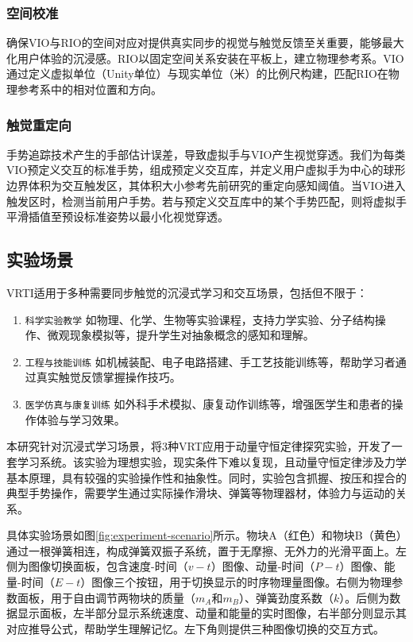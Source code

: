\documentclass[runningheads]{llncs}
\begin{document}
\subsubsection{空间校准}
确保VIO与RIO的空间对应对提供真实同步的视觉与触觉反馈至关重要，能够最大化用户体验的沉浸感。RIO以固定空间关系安装在平板上，建立物理参考系。VIO通过定义虚拟单位（Unity单位）与现实单位（米）的比例尺构建，匹配RIO在物理参考系中的相对位置和方向。

\subsubsection{触觉重定向}
手势追踪技术产生的手部估计误差，导致虚拟手与VIO产生视觉穿透。我们为每类VIO预定义交互的标准手势，组成预定义交互库，并定义用户虚拟手为中心的球形边界体积为交互触发区，其体积大小参考先前研究的重定向感知阈值。当VIO进入触发区时，检测当前用户手势。若与预定义交互库中的某个手势匹配，则将虚拟手平滑插值至预设标准姿势以最小化视觉穿透。


\subsection{实验场景}
VRTI适用于多种需要同步触觉的沉浸式学习和交互场景，包括但不限于：

\begin{enumerate}[label={\arabic*)}]
  \item \texttt{科学实验教学} 如物理、化学、生物等实验课程，支持力学实验、分子结构操作、微观现象模拟等，提升学生对抽象概念的感知和理解。
  \item \texttt{工程与技能训练} 如机械装配、电子电路搭建、手工艺技能训练等，帮助学习者通过真实触觉反馈掌握操作技巧。
  \item \texttt{医学仿真与康复训练} 如外科手术模拟、康复动作训练等，增强医学生和患者的操作体验与学习效果。
\end{enumerate}

本研究针对沉浸式学习场景，将3种VRT应用于动量守恒定律探究实验，开发了一套学习系统。该实验为理想实验，现实条件下难以复现，且动量守恒定律涉及力学基本原理，具有较强的实验操作性和抽象性。同时，实验包含抓握、按压和捏合的典型手势操作，需要学生通过实际操作滑块、弹簧等物理器材，体验力与运动的关系。

具体实验场景如图\ref{fig:experiment-scenario}所示。物块A（红色）和物块B（黄色）通过一根弹簧相连，构成弹簧双振子系统，置于无摩擦、无外力的光滑平面上。左侧为图像切换面板，包含速度-时间（$v-t$）图像、动量-时间（$P-t$）图像、能量-时间（$E-t$）图像三个按钮，用于切换显示的时序物理量图像。右侧为物理参数面板，用于自由调节两物块的质量（$m_A$和$m_B$）、弹簧劲度系数（$k$）。后侧为数据显示面板，左半部分显示系统速度、动量和能量的实时图像，右半部分则显示其对应推导公式，帮助学生理解记忆。左下角则提供三种图像切换的交互方式。
\end{document}

